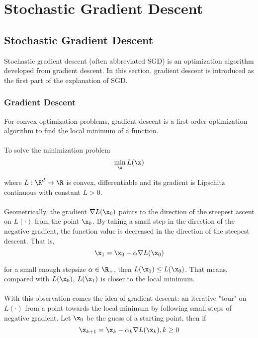 
\chapter{Stochastic Gradient Descent}
\label{ch: sgd}
% 

\section{Stochastic Gradient Descent}

    Stochastic gradient descent (often abbreviated SGD) is an optimization algorithm developed from gradient descent. 
    In this section, gradient descent is introduced as the first part of the explanation of SGD.

    \subsection{Gradient Descent}
        For convex optimization problems, gradient descent is a first-order optimization algorithm 
        to find the local minimum of a function.
        \\\\
        To solve the minimization problem 
        \begin{equation}
            \min_{\x} L(\x) 
        \end{equation} 
        
        where $L : \R^d \to \R$ is convex, differentiable and its gradient is Lipschitz continuous with constant
        $L > 0$.
        \\\\
        Geometrically, the gradient $\nabla L(\x_0)$ points to the direction of the steepest ascent on $L(\cdot)$ 
        from the point $\x_0$. 
        By taking a small step in the direction of the negative gradient, the function value is decreased in the 
        direction of the steepest descent. That is,
        \begin{equation}
            \x_1  = \x_0 - \alpha \nabla L(\x_0)
        \end{equation}
    
        for a small enough stepsize $\alpha \in \R_{+}$, then $L(\x_1) \leq L(\x_0)$. 
        That means, compared with $L(\x_0)$, $L(\x_1)$ is closer to the local minimum.
        \\\\
        With this observation comes the idea of gradient descent: an iterative "tour" on $L(\cdot)$ from a point towards the 
        local minimum by following small steps of negative gradient. 
        Let $\x_0$ be the guess of a starting point, then if
        \begin{equation}
            \x_{k+1} = \x_{k} - \alpha_k \nabla L(\x_k), k \geq 0
        \end{equation}
        
